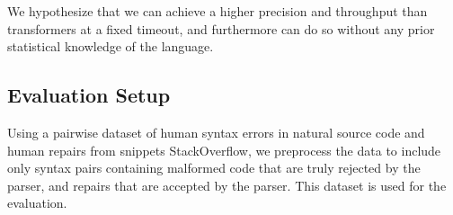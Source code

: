 \documentclass[sigplan,screen]{acmart}
\begin{document}

We hypothesize that we can achieve a higher precision and throughput than transformers at a fixed timeout, and furthermore can do so without any prior statistical knowledge of the language.

\subsection{Evaluation Setup}


Using a pairwise dataset of human syntax errors in natural source code and human repairs from snippets StackOverflow, we preprocess the data to include only syntax pairs containing malformed code that are truly rejected by the parser, and repairs that are accepted by the parser. This dataset is used for the evaluation.



\end{document}
